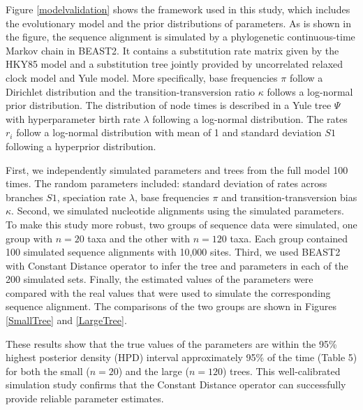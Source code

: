 \documentclass{bmcart}
\begin{document}
Figure \ref{modelvalidation} shows the framework used in this study, which includes the evolutionary model and the prior distributions of parameters. As is shown in the figure, the sequence alignment is simulated by a phylogenetic continuous-time Markov chain in BEAST2. It contains a substitution rate matrix given by the HKY85 \cite{hasegawa1985dating} model and a substitution tree jointly provided by uncorrelated relaxed clock model and Yule model. More specifically, base frequencies $\pi$ follow a Dirichlet distribution and the transition-transversion ratio $\kappa$ follows a log-normal prior distribution. The distribution of node times is described in a Yule tree $\Psi$ with hyperparameter birth rate $\lambda $ following a log-normal distribution. The rates $r_i$ follow a log-normal distribution with mean of 1 and standard deviation $S1$ following a hyperprior distribution.  

First, we independently simulated parameters and trees from the full model 100 times. The random parameters included: standard deviation of rates across branches $S1$, speciation rate $\lambda $, base frequencies $\pi$ and transition-transversion bias $\kappa$. Second, we simulated nucleotide alignments using the simulated parameters. To make this study more robust, two groups of sequence data were simulated, one group with $n=20$ taxa and the other with $n=120$ taxa. Each group contained 100 simulated sequence alignments with 10,000 sites. Third, we used BEAST2 with Constant Distance operator to infer the tree and parameters in each of the 200 simulated sets. Finally, the estimated values of the parameters were compared with the real values that were used to simulate the corresponding sequence alignment. The comparisons of the two groups are shown in Figures \ref{SmallTree} and \ref{LargeTree}. 

These results show that the true values of the parameters are within the 95\% highest posterior density (HPD) interval approximately 95\% of the time (Table 5) for both the small ($n=20$) and the large ($n=120$) trees. This well-calibrated simulation study confirms that the Constant Distance operator can successfully provide reliable parameter estimates.

\end{document}
